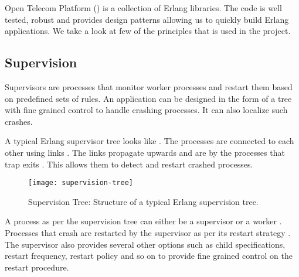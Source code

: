 Open Telecom Platform () is a collection of Erlang libraries.
The  code is
well tested, robust and provides design patterns allowing us to quickly build
Erlang applications. We take a look at few of the  principles
that is used in the project.

\subsection{Supervision}
\label{section:concepts.supervision}

Supervisors are processes that monitor worker processes and restart them based
on predefined sets of rules. An application can be designed in the form of a
tree with fine grained control to handle crashing processes. It can also
localize such crashes.

A typical Erlang supervisor tree looks like . The
processes are connected to each other using links%
. The links propagate upwards and are  by the processes that trap
exits%
. This allows them to detect and restart crashed processes.

\begin{figure}
  \texttt{[image: supervision-tree]}
  \caption[Supervision Tree]{%
    Supervision Tree: Structure of a typical Erlang supervision tree.}
  \label{figure:supervision.tree}
  \normalcaption
\end{figure}

A process as per the supervision tree can either be a supervisor%
or a worker%
. Processes that crash are restarted by the supervisor as per its
restart strategy%
. The supervisor also provides several other options such as child
specifications, restart frequency, restart policy and so on to provide
fine grained control on the restart procedure.

